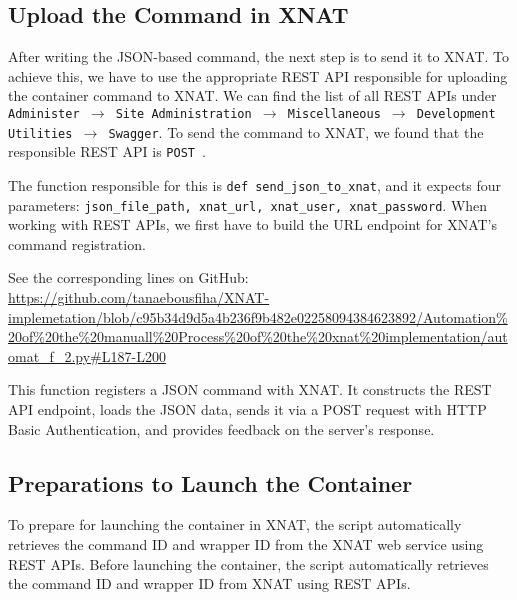 \subsection{Upload the Command in XNAT}

After writing the JSON-based command, the next step is to send it to XNAT. To achieve this, we have to use the appropriate REST API responsible for uploading the container command to XNAT.
We can find the list of all REST APIs under \texttt{Administer $\rightarrow$ Site Administration $\rightarrow$ Miscellaneous $\rightarrow$ Development Utilities $\rightarrow$ Swagger}.
To send the command to XNAT, we found that the responsible REST API is \texttt{POST}~\cite{ContainerRESTAPILIST}.

The function responsible for this is \texttt{def send\_json\_to\_xnat}, and it expects four parameters: \texttt{json\_file\_path, xnat\_url, xnat\_user, xnat\_password}. When working with REST APIs, we first have to build the URL endpoint for XNAT’s command registration.
 


\noindent\footnotesize See the corresponding lines on GitHub:\url{ https://github.com/tanaebousfiha/XNAT-implemetation/blob/c95b34d9d5a4b236f9b482e02258094384623892/Automation%20of%20the%20manuall%20Process%20of%20the%20xnat%20implementation/automat_f_2.py#L187-L200}
\normalsize

This function registers a JSON command with XNAT. It constructs the REST API endpoint, loads the JSON data, sends it via a POST request with HTTP Basic Authentication, and provides feedback on the server's response.

\subsection{Preparations to Launch the Container}

To prepare for launching the container in XNAT, the script automatically retrieves the command ID and wrapper ID from the XNAT web service using REST APIs.
Before launching the container, the script automatically retrieves the command ID and wrapper ID from XNAT using REST APIs.


